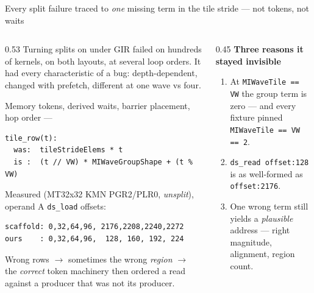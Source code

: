 \begin{frame}[fragile]{Every split failure traced to \emph{one} missing term in the tile stride --- not tokens, not waits}

\begin{columns}[T]
\begin{column}{0.53\textwidth}
\footnotesize
Turning splits on under GIR failed on hundreds of kernels, on both layouts, at several loop
orders. It had every characteristic of a  bug: depth-dependent, changed with
prefetch, different at one wave vs four.

\smallskip
Memory tokens, derived waits, barrier placement, hop order --- 

\begin{lstlisting}[style=pseudo]
tile_row(t):
  was:  tileStrideElems * t
  is :  (t // VW) * MIWaveGroupShape + (t % VW)
\end{lstlisting}

\smallskip
Measured (MT32x32 KMN PGR2/PLR0, \emph{unsplit}), operand A \texttt{ds\_load} offsets:
\begin{lstlisting}[style=pseudo]
scaffold: 0,32,64,96, 2176,2208,2240,2272
ours    : 0,32,64,96,  128, 160, 192, 224
\end{lstlisting}
Wrong rows $\rightarrow$ sometimes the wrong \emph{region} $\rightarrow$ the \emph{correct} token
machinery then ordered a read against a producer that was not its producer. 
\end{column}

\begin{column}{0.45\textwidth}
\footnotesize
\textbf{Three reasons it stayed invisible}
\begin{enumerate}\itemsep1pt\parskip0pt
\item {} At \texttt{MIWaveTile == VW} the
group term is zero --- and every fixture pinned \texttt{MIWaveTile == VW == 2}.
\item {} \texttt{ds\_read offset:128} is as
well-formed as \texttt{offset:2176}.
\item {} One wrong term still yields a
\emph{plausible} address --- right magnitude, alignment, region count.
\end{enumerate}


\end{column}
\end{columns}
\end{frame}

